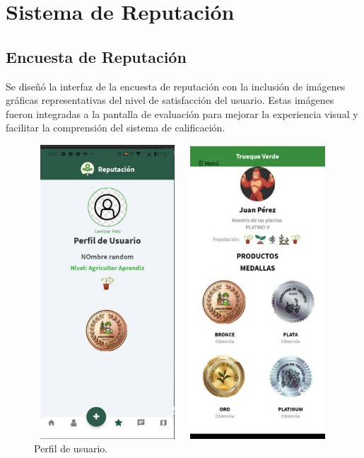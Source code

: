 \documentclass[11pt, a4paper, oneside]{book}
\begin{document}
\chapter{Sistema de Reputación}

\section{Encuesta de Reputación}

Se diseñó la interfaz de la encuesta de reputación con la inclusión de imágenes gráficas representativas del nivel de satisfacción del usuario. Estas imágenes fueron integradas a la pantalla de evaluación para mejorar la experiencia visual y facilitar la comprensión del sistema de calificación.


\begin{figure}[H]
    \centering
    \begin{minipage}{0.45\textwidth}
        \centering
        \includegraphics[width=5.5cm,height=11cm]{Pictures/reputacion7.jpg}
        \caption{Perfil de usuario.}
    \end{minipage}
    \hfill
    \begin{minipage}{0.40\textwidth} 
        \centering
        \includegraphics[width=5.5cm,height=11cm]{Pictures/reputacion6.jpg}

\end{minipage}
\end{figure}
\end{document}
